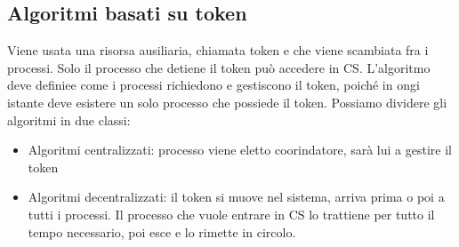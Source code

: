 \documentclass[16px]{article}
\begin{document}
\subsection{Algoritmi basati su token}
Viene usata una risorsa ausiliaria, chiamata token e che viene scambiata fra i processi. Solo il processo che detiene il token può accedere in CS. L'algoritmo deve definiee come i processi richiedono e gestiscono il token, poiché in ongi istante deve esistere un solo processo che possiede il token. Possiamo dividere gli algoritmi in due classi:
\begin{itemize}
\item Algoritmi centralizzati: processo viene eletto coorindatore, sarà lui a gestire il token
\item Algoritmi decentralizzati: il token si muove nel sistema, arriva prima o poi a tutti i processi. Il processo che vuole entrare in CS lo trattiene per tutto il tempo necessario, poi esce e lo rimette in circolo.
\end{itemize}
\end{document}
